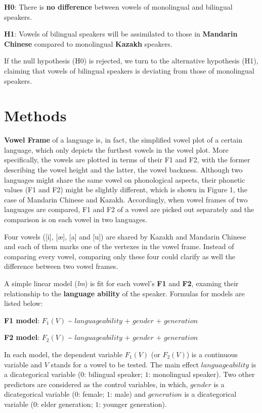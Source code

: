 \documentclass[
  man,floatsintext]{apa6}
\begin{document}
\textbf{H0}: There is \textbf{no difference} between vowels of monolingual and bilingual speakers.

\textbf{H1}: Vowels of bilingual speakers will be assimilated to those in \textbf{Mandarin Chinese} compared to monolingual \textbf{Kazakh} speakers.

If the null hypothesis (H0) is rejected, we turn to the alternative hypothesis (H1), claiming that vowels of bilingual speakers is deviating from those of monolingual speakers.

\section{Methods}\label{methods}

\textbf{Vowel Frame} of a language is, in fact, the simplified vowel plot of a certain language, which only depicts the furthest vowels in the vowel plot. More specifically, the vowels are plotted in terms of their F1 and F2, with the former describing the vowel height and the latter, the vowel backness. Although two languages might share the same vowel on phonological aspects, their phonetic values (F1 and F2) might be slightly different, which is shown in Figure 1, the case of Mandarin Chinese and Kazakh. Accordingly, when vowel frames of two languages are compared, F1 and F2 of a vowel are picked out separately and the comparison is on each vowel in two languages.

Four vowels ({[}i{]}, {[}æ{]}, {[}a{]} and {[}u{]}) are shared by Kazakh and Mandarin Chinese and each of them marks one of the vertexes in the vowel frame. Instead of comparing every vowel, comparing only these four could clarify as well the difference between two vowel frames.

A simple linear model (\emph{lm}) is fit for each vowel's \textbf{F1} and \textbf{F2}, examing their relationship to the \textbf{language ability} of the speaker. Formulas for models are listed below:

\textbf{F1 model}: \(F_1(V)\) \textasciitilde{} \(language ability\) \(+\) \(gender\) \(+\) \(generation\)

\textbf{F2 model}: \(F_2(V)\) \textasciitilde{} \(language ability\) \(+\) \(gender\) \(+\) \(generation\)

In each model, the dependent variable \(F_1(V)\) (or \(F_2(V)\)) is a continuous variable and \(V\) stands for a vowel to be tested. The main effect \(language ability\) is a dicategorical variable (\(0\): bilingual speaker; \(1\): monolingual speaker). Two other predictors are considered as the control variables, in which, \(gender\) is a dicategorical variable (\(0\): female; \(1\): male) and \(generation\) is a dicategorical variable (\(0\): elder generation; \(1\): younger generation).
\end{document}
